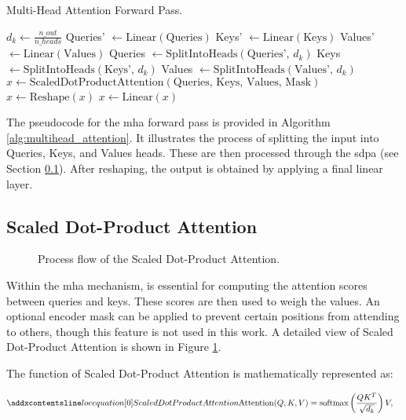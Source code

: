 \begin{algorithm}[H]
\caption{Multi-Head Attention Forward Pass.}
\label{alg:multihead_attention}
$d_k \gets \frac{n\_out}{n\_heads}$\;
Queries' $\gets \text{Linear}(\text{Queries})$\;
Keys' $\gets \text{Linear}(\text{Keys})$\;
Values' $\gets \text{Linear}(\text{Values})$\;
Queries $\gets \text{SplitIntoHeads}(\text{Queries', }d_k)$\;
Keys $\gets \text{SplitIntoHeads}(\text{Keys', }d_k)$\;
Values $\gets \text{SplitIntoHeads}(\text{Values', }d_k)$\;
$x \gets \text{ScaledDotProductAttention}(\text{Queries, Keys, Values, Mask})$\;
$x \gets \text{Reshape}(x)$\;
$x \gets \text{Linear}(x)$\;
\end{algorithm}
\vspace{3mm}

The pseudocode for the \gls{mha} forward pass is provided in Algorithm \ref{alg:multihead_attention}. It illustrates the process of splitting the input into Queries, Keys, and Values heads. These are then processed through the \gls{sdpa} (see Section \ref{sec:sdpa}). After reshaping, the output is obtained by applying a final linear layer.


\subsection{Scaled Dot-Product Attention}
\label{sec:sdpa}

\begin{figure}[t]
    \centering
    
    \caption{Process flow of the Scaled Dot-Product Attention.}
    \label{fig:scaled_dot_product}
\end{figure}
Within the \gls{mha} mechanism,  is essential for computing the attention scores between queries and keys. These scores are then used to weigh the values. An optional encoder mask can be applied to prevent certain positions from attending to others, though this feature is not used in this work. A detailed view of Scaled Dot-Product Attention is shown in Figure \ref{fig:scaled_dot_product}.

The function of Scaled Dot-Product Attention is mathematically represented as:

\begin{align}
\setequationentry{Scaled Dot Product Attention}
    \text{Attention}(Q, K, V) &= \text{softmax}\left(\frac{QK^T}{\sqrt{d_k}}\right)V,
\end{align}

